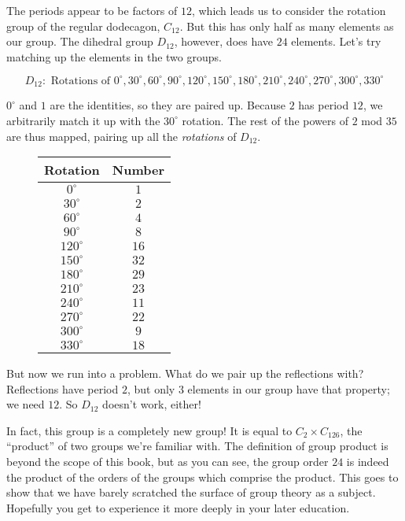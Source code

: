 \documentclass[../gatm.tex]{subfiles}
\begin{document}
The periods appear to be factors of $12$, which leads us to consider the rotation group of the regular dodecagon, $C_{12}$. But this has only half as many elements as our group. The dihedral group $D_{12}$, however, does have $24$ elements. Let's try matching up the elements in the two groups.

$$D_{12}:\text{ Rotations of } 0^\circ, 30^\circ, 60^\circ, 90^\circ, 120^\circ, 150^\circ, 180^\circ, 210^\circ, 240^\circ, 270^\circ, 300^\circ, 330^\circ$$

\noindent$0^\circ$ and $1$ are the identities, so they are paired up. Because $2$ has period $12$, we arbitrarily match it up with the $30^\circ$ rotation. The rest of the powers of $2$ mod $35$ are thus mapped, pairing up all the \textit{rotations} of $D_{12}$.

\vspace*{3\baselineskip}

\begin{figure}[h]
	\begin{center}
		\begin{minipage}[b]{\textwidth}
			\centering
			\begin{tabular}{cc}
				\hline
				Rotation & Number \\ \hline
				\rowcolor{light-gray}
				$0^\circ$ & $1$ \\
				$30^\circ$ & $2$ \\
				\rowcolor{light-gray}
				$60^\circ$ & $4$ \\
				$90^\circ$ & $8$ \\
				\rowcolor{light-gray}
				$120^\circ$ & $16$ \\
				$150^\circ$ & $32$ \\
				\rowcolor{light-gray}
				$180^\circ$ & $29$ \\
				$210^\circ$ & $23$ \\
				\rowcolor{light-gray}
				$240^\circ$ & $11$ \\
				$270^\circ$ & $22$ \\
				\rowcolor{light-gray}
				$300^\circ$ & $9$ \\
				$330^\circ$ & $18$ \\ \hline
			\end{tabular}
		\end{minipage}
	\end{center}
\end{figure}


\noindent But now we run into a problem. What do we pair up the reflections with? Reflections have period $2$, but only $3$ elements in our group have that property; we need $12$. So $D_{12}$ doesn't work, either!

In fact, this group is a completely new group! It is equal to $C_2\times C_126$, the ``product'' of two groups we're familiar with. The definition of group product is beyond the scope of this book, but as you can see, the group order $24$ is indeed the product of the orders of the groups which comprise the product. This goes to show that we have barely scratched the surface of group theory as a subject. Hopefully you get to experience it more deeply in your later education.
\end{document}
